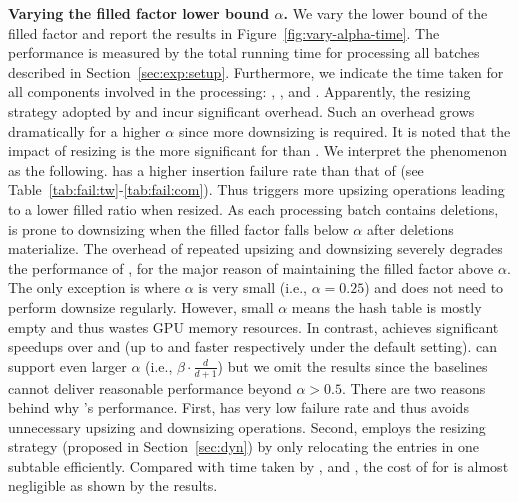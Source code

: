 \vspace{1mm}\noindent\textbf{Varying the filled factor lower bound $\alpha$.}
We vary the lower bound of the filled factor and report the results in Figure~\ref{fig:vary-alpha-time}. 
The performance is measured by the total running time for processing all batches described in Section~\ref{sec:exp:setup}. Furthermore, we indicate the time taken for all components involved in the processing: , ,  and . Apparently, the resizing strategy adopted by \linear and \megakv incur significant overhead. Such an overhead grows dramatically for a higher $\alpha$ since more downsizing is required. It is noted that the impact of resizing is the more significant for \megakv than \linear. We interpret the phenomenon as the following.
\megakv has a higher insertion failure rate than that of \linear (see Table~\ref{tab:fail:tw}-\ref{tab:fail:com}). Thus \megakv triggers more upsizing operations leading to a lower filled ratio when resized. As each processing batch contains deletions, \megakv is prone to downsizing when the filled factor falls below $\alpha$ after deletions materialize.
The overhead of repeated upsizing and downsizing severely degrades the performance of \megakv, for the major reason of maintaining the filled factor above $\alpha$. 
The only exception is where $\alpha$ is very small (i.e., $\alpha=0.25$) and \megakv does not need to perform downsize regularly. However, small $\alpha$ means the hash table is mostly empty and thus wastes GPU memory resources.
In contrast, \voter achieves significant speedups over \linear and \megakv (up to \xxx and \xxx faster respectively under the default setting). 
\voter can support even larger $\alpha$ (i.e., $\beta\cdot\frac{d}{d+1}$) but we omit the results since the baselines cannot deliver reasonable performance beyond $\alpha > 0.5$.
There are two reasons behind why \voter's performance. First, \voter has very low failure rate and thus avoids unnecessary upsizing and downsizing operations. Second, \voter employs the resizing strategy (proposed in Section~\ref{sec:dyn}) by only relocating the entries in one subtable efficiently. 
Compared with time taken by ,  and , the cost of  for \voter is almost negligible as shown by the results. 



